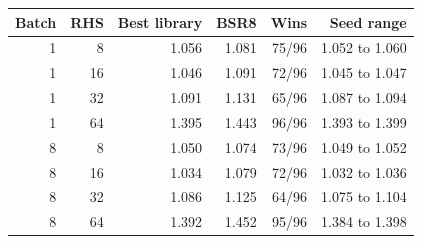 \begin{tabular}{rrrrrr}
\toprule
Batch & RHS & Best library & BSR8 & Wins & Seed range \\
\midrule
1 & 8 & 1.056 & 1.081 & 75/96 & 1.052 to 1.060 \\
1 & 16 & 1.046 & 1.091 & 72/96 & 1.045 to 1.047 \\
1 & 32 & 1.091 & 1.131 & 65/96 & 1.087 to 1.094 \\
1 & 64 & 1.395 & 1.443 & 96/96 & 1.393 to 1.399 \\
8 & 8 & 1.050 & 1.074 & 73/96 & 1.049 to 1.052 \\
8 & 16 & 1.034 & 1.079 & 72/96 & 1.032 to 1.036 \\
8 & 32 & 1.086 & 1.125 & 64/96 & 1.075 to 1.104 \\
8 & 64 & 1.392 & 1.452 & 95/96 & 1.384 to 1.398 \\
\bottomrule
\end{tabular}
